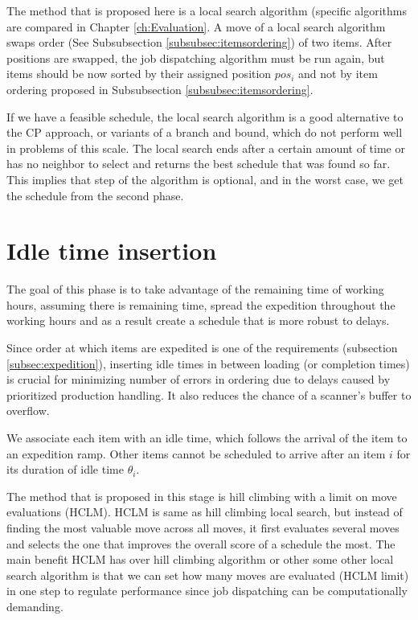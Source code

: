 \documentclass{ctuthesis}
\begin{document}
The method that is proposed here is a local search algorithm (specific algorithms are compared in Chapter \ref{ch:Evaluation}. A move of a local search algorithm swaps order (See Subsubsection \ref{subsubsec:itemsordering}) of two items. After positions are swapped, the job dispatching algorithm must be run again, but items should be now sorted by their assigned position $pos_i$ and not by item ordering proposed in Subsubsection \ref{subsubsec:itemsordering}.

If we have a feasible schedule, the local search algorithm is a good alternative to the CP approach, or variants of a branch and bound, which do not perform well in problems of this scale. The local search ends after a certain amount of time or has no neighbor to select and returns the best schedule that was found so far. This implies that step of the algorithm is optional, and in the worst case, we get the schedule from the second phase.

\section{Idle time insertion}
\label{sec:idletimeinsertion}
The goal of this phase is to take advantage of the remaining time of working hours, assuming there is remaining time, spread the expedition throughout the working hours and as a result create a schedule that is more robust to delays. 

Since order at which items are expedited is one of the requirements (subsection \ref{subsec:expedition}), inserting idle times in between loading (or completion times) is crucial for minimizing number of errors in ordering due to delays caused by prioritized production handling. It also reduces the chance of a scanner's buffer to overflow.


We associate each item with an idle time, which follows the arrival of the item to an expedition ramp. Other items cannot be scheduled to arrive after an item $i$ for its duration of idle time $\theta_i$.

The method that is proposed in this stage is hill climbing with a limit on move evaluations (HCLM). HCLM is same as hill climbing local search, but instead of finding the most valuable move across all moves, it first evaluates several moves and selects the one that improves the overall score of a schedule the most. The main benefit HCLM has over hill climbing algorithm or other some other local search algorithm is that we can set how many moves are evaluated (HCLM limit) in one step to regulate performance since job dispatching can be computationally demanding.
\end{document}
